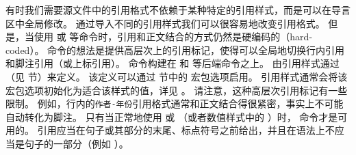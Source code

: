 
有时我们需要源文件中的引用格式不依赖于某种特定的引用样式，而是可以在导言区中全局修改。
通过导入不同的引用样式我们可以很容易地改变引用格式。
但是，当使用  或  等命令时，引用和正文结合的方式仍然是硬编码的（hard-coded）。
 命令的想法是提供高层次上的引用标记，使得可以全局地切换行内引用和脚注引用（或上标引用）。
 命令构建在  和  等后端命令之上。
由引用样式通过  （见  节）来定义。
该定义可以通过  节中的  宏包选项启用。
引用样式通常会将该宏包选项初始化为适合该样式的值，详见 。
请注意，这种高层次引用标记有一些限制。
例如，行内的\texttt{作者-年份}引用格式通常和正文结合得很紧密，事实上不可能自动转化为脚注。
只有当正常地使用  或  （或者数值样式中的 ）时， 命令才是可用的。
引用应当在句子或其部分的末尾、标点符号之前给出，并且在语法上不应当是句子的一部分（例如 ）。

